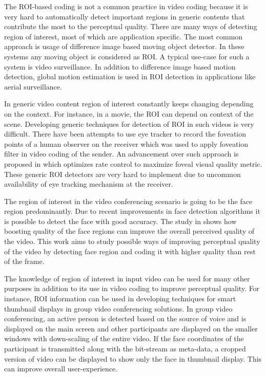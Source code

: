 \documentclass[11pt]{article} %
\begin{document}
The ROI-based coding is not a common practice in video coding because it is very hard to automatically detect important regions in generic contents that contribute the most to the perceptual quality. There are many ways of detecting region of interest, most of which are application specific. The most common approach is usage of difference image based moving object detector. In these systems any moving object is considered as ROI. A typical use-case for such a system is video surveillance. In addition to difference image based motion detection, global motion estimation is used in ROI detection \cite{ROI-aerial-surveillance} in applications like aerial surveillance.

In generic video content region of interest constantly keeps changing depending on the context. For instance, in a movie, the ROI can depend on context of the scene. Developing generic techniques for detection of ROI in such videos is very difficult. There have been attempts to use eye tracker to record the foveation points of a human observer on the receiver which was used to apply foveation filter in video coding of the sender. An advancement over such approach is proposed in \cite{foveated-rate-control} which optimizes rate control to maximize foveal visual quality metric. These generic ROI detectors are very hard to implement due to uncommon availability of eye tracking mechanism at the receiver. 

The region of interest in the video conferencing scenario is going to be the face region predominantly. Due to recent improvements in face detection algorithms it is possible to detect the face with good accuracy. The study in \cite{HighQualityROICodingForVideoConferencing} shows how boosting quality of the face regions can improve the overall perceived quality of the video. This work aims to study possible ways of improving perceptual quality of the video by detecting face region and coding it with higher quality than rest of the frame.

The knowledge of region of interest in input video can be used for many other purposes in addition to its use in video coding to improve perceptual quality. For instance, ROI information can be used in developing techniques for smart thumbnail displays in group video conferencing solutions. In group video conferencing, an active person is detected based on the source of voice and is displayed on the main screen and other participants are displayed on the smaller windows with down-scaling of the entire video. If the face coordinates of the participant is transmitted along with the bit-stream as meta-data, a cropped version of video can be displayed to show only the face in thumbnail display. This can improve overall user-experience.
\end{document}
